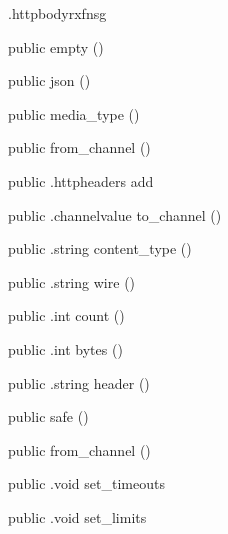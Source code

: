 \begin{CrexxClass}{.httpbody}{rxfnsg}

  \begin{Hierarchy}
  \end{Hierarchy}

  \begin{Members}

    \Factory
      {public}
      {empty}
      {()}

    \Factory
      {public}
      {json}
      {()}

    \Factory
      {public}
      {media\_type}
      {()}

    \Factory
      {public}
      {from\_channel}
      {()}

    \Method
      {public}
      {.httpheaders}
      {add}
      {}

    \Method
      {public}
      {.channelvalue}
      {to\_channel}
      {()}

    \Method
      {public}
      {.string}
      {content\_type}
      {()}

    \Method
      {public}
      {.string}
      {wire}
      {()}

    \Method
      {public}
      {.int}
      {count}
      {()}

    \Method
      {public}
      {.int}
      {bytes}
      {()}

    \Method
      {public}
      {.string}
      {header}
      {()}

    \Factory
      {public}
      {safe}
      {()}

    \Factory
      {public}
      {from\_channel}
      {()}

    \Method
      {public}
      {.void}
      {set\_timeouts}
      {}

    \Method
      {public}
      {.void}
      {set\_limits}
      {}


\end{Members}
\end{CrexxClass}
